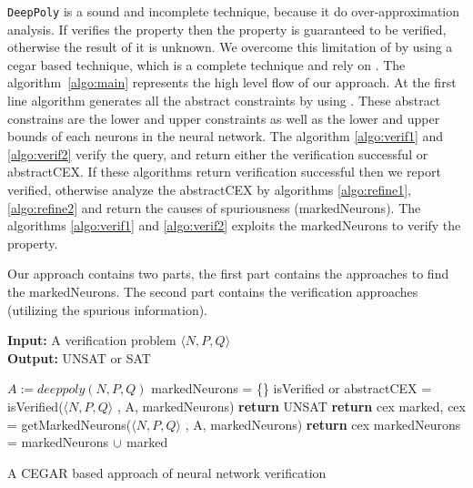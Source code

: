 \texttt{DeepPoly} is a sound and incomplete technique, because it do over-approximation analysis. 
If \deeppoly{} verifies the property then the property is guaranteed to be verified, otherwise the result of it is unknown. 
We overcome this limitation of \deeppoly{} by using a cegar based technique, which is a complete technique and rely on \deeppoly{}. 
The algorithm~\ref{algo:main} represents the high level flow of our approach.
At the first line algorithm generates all the abstract constraints by using \deeppoly{}. 
These abstract constrains are the lower and upper constraints as well as the lower and upper bounds 
of each neurons in the neural network. The algorithm \ref{algo:verif1} and \ref{algo:verif2} verify the query, 
and return either the verification successful or abstractCEX. If these algorithms return verification successful then we report verified,
otherwise analyze the abstractCEX by algorithms \ref{algo:refine1}, \ref{algo:refine2} and return the causes of spuriousness (markedNeurons). 
The algorithms \ref{algo:verif1} and \ref{algo:verif2} exploits the markedNeurons to verify the property. 

Our approach contains two parts, the first part contains the approaches to find the markedNeurons. 
The second part contains the verification approaches (utilizing the spurious information).

\begin{algorithm}[t]
  \textbf{Input: } A verification problem $\langle N,P,Q \rangle$ \\
  \textbf{Output: } UNSAT or SAT
  \begin{algorithmic}[1]
    \State $A := deeppoly(N,P,Q)$
    \State markedNeurons = \{\}
      \State isVerified or abstractCEX = isVerified($\langle N,P,Q \rangle$ , A, markedNeurons)
        \State \textbf{return} UNSAT
      \Else
          \State \textbf{return} cex
        \Else
          \State marked, cex = getMarkedNeurons($\langle N,P,Q \rangle$ , A, markedNeurons)
            \State \textbf{return} cex
          \EndIf
          \State markedNeurons = markedNeurons ${\cup}$ marked
        \EndIf
      \EndIf
    \EndWhile
  \end{algorithmic}
  \caption{A CEGAR based approach of neural network verification}
  \label{algo:main}
\end{algorithm}

